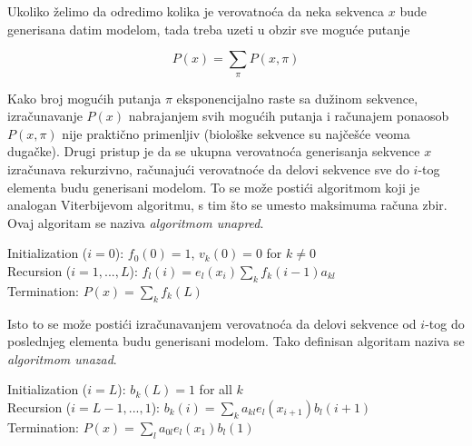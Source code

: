 \documentclass[a4paper, 12pt]{article}
\begin{document}
\newpage

Ukoliko želimo da odredimo kolika je verovatnoća da neka sekvenca $x$ bude generisana datim modelom, tada treba uzeti u obzir sve moguće putanje

$$P(x) = \sum_{\pi}P(x, \pi)$$

\noindent Kako broj mogućih putanja $\pi$ eksponencijalno raste sa dužinom sekvence, izračunavanje $P(x)$ nabrajanjem svih mogućih putanja i računajem ponaosob $P(x, \pi)$ nije praktično primenljiv (biološke sekvence su najčešće veoma dugačke). Drugi pristup je da se ukupna verovatnoća generisanja sekvence $x$ izračunava rekurzivno, računajući verovatnoće da delovi sekvence sve do $i$-tog elementa budu generisani modelom. To se može postići algoritmom koji je analogan Viterbijevom algoritmu, s tim što se umesto maksimuma računa zbir. Ovaj algoritam se naziva \textit{algoritmom unapred}.

\begin{algorithm}[h!] 
 \vspace*{0.2cm}
 Initialization ($i=0$): \hspace{0.3cm} $f_0(0) = 1$, $v_k(0) = 0$ for $k \neq 0$ \\
 \vspace*{0.2cm}
 Recursion ($i=1, ..., L$): \hspace{0.05cm}$f_l(i) = e_l(x_i)\sum_k f_k(i-1)a_{kl}$ \\
 \vspace*{0.2cm}
 Termination: \hspace{1.8cm} $P(x) = \sum_k f_k(L)$ \\
\end{algorithm}

\noindent Isto to se može postići izračunavanjem verovatnoća da delovi sekvence od $i$-tog do poslednjeg elementa budu generisani modelom. Tako definisan algoritam naziva se \textit{algoritmom unazad}.

\begin{algorithm}[h!] 
 \vspace*{0.2cm}
 Initialization ($i=L$): \hspace{1cm} $b_k(L) = 1$ for all $k$ \\
 \vspace*{0.2cm}
 Recursion ($i=L-1, ..., 1$): \hspace{0.05cm}$b_k(i) = \sum_k a_{kl}e_l(x_{i+1})b_l(i+1)$ \\
 \vspace*{0.2cm}
 Termination: \hspace{2.5cm} $P(x) = \sum_l a_{0l}e_l(x_1)b_l(1)$ \\
\end{algorithm}
\end{document}
